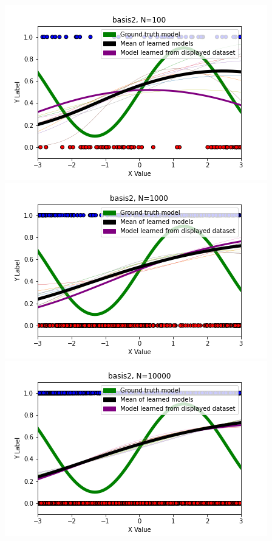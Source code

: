 \documentclass[submit]{harvardml}
\begin{document}
\begin{enumerate}
            \includegraphics[scale=0.3]{solutions/T2_P1_plots/basis2, N=100.png}
            \includegraphics[scale=0.3]{solutions/T2_P1_plots/basis2, N=1000.png}
            \includegraphics[scale=0.3]{solutions/T2_P1_plots/basis2, N=10000.png}


\end{enumerate}
\end{document}
